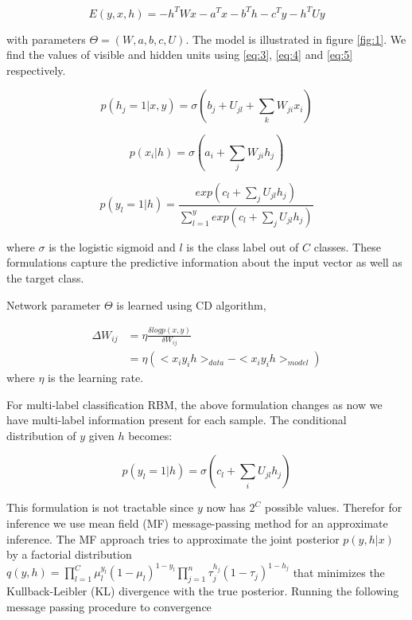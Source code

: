 \documentclass{article}
\begin{document}
\begin{equation}
  E(y,x,h) = -h^TWx - a^Tx -b^Th - c^Ty - h^TUy
  \label{eq:2}
\end{equation}

with parameters $\Theta = (W,a,b,c,U)$. The model is illustrated in figure \ref{fig:1}. We find the values of visible and hidden units using \autoref{eq:3}, \autoref{eq:4} and \autoref{eq:5} respectively.

\begin{equation}
  p(h_j=1|x,y) = \sigma(b_j+U_{jl}+\sum_kW_{ji}x_i)
  \label{eq:3}
\end{equation}

\begin{equation}
  p(x_i|h) = \sigma(a_i + \sum_jW_{ji}h_j)
  \label{eq:4}
\end{equation}

\begin{equation}
  p(y_l=1|h) = \frac{exp(c_l+\sum_{j}U_{jl}h_j)}{\sum_{l=1}^{y}exp(c_l+\sum_{j}U_{jl}h_j)}
  \label{eq:5}
\end{equation}

where $\sigma$ is the logistic sigmoid and $l$ is the class label out of $C$ classes. These formulations capture the predictive information about the input vector as well as the target class.

Network parameter $\Theta$ is learned using CD \cite{CD2002hinton} algorithm,

\begin{align}
  \Delta W_{ij} & = \eta \frac{\delta logp(x,y)}{\delta W_{ij}} \nonumber \\
                  & = \eta (<x_iy_ih>_{data}-<x_iy_ih>_{model})
                  \label{eq:6}
\end{align}
where $\eta$ is the learning rate.

For multi-label classification RBM, the above formulation changes as now we have multi-label information present for each sample. The conditional distribution of $y$ given $h$ becomes:

\begin{equation}
  p(y_{l}=1|h) = \sigma(c_l + \sum_iU_{jl}h_j)
  \label{eq:7}
\end{equation}

This formulation is not tractable since $y$ now has $2^C$ possible values. Therefor for inference we use mean field (MF) message-passing method for an approximate inference. The MF approach tries to approximate the joint posterior $p(y,h|x)$ by a factorial distribution $q(y,h) = \prod^C_{l=1}\mu^{y_l}_l(1-\mu_l)^{1-y_l}\prod^n_{j=1}\tau^{h_j}_j(1-\tau_j)^{1-h_j}$ that minimizes the Kullback-Leibler (KL) divergence with the true posterior. Running the following message passing procedure to convergence
\end{document}
